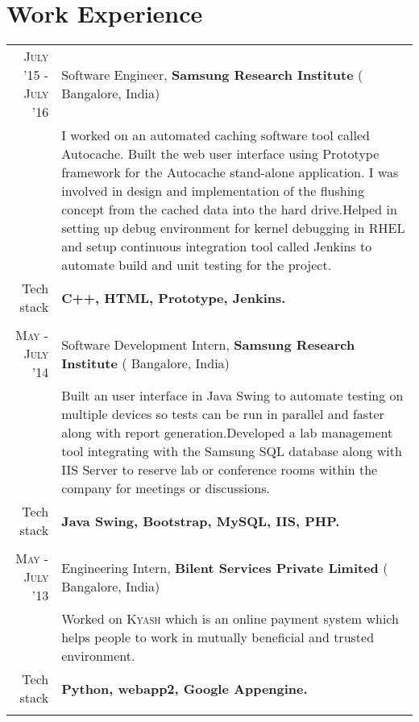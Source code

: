 \section{Work Experience}
\renewcommand{\arraystretch}{0.85}%
\begin{tabular}{r|p{14cm}}

\textsc{July '15 - July '16} & Software Engineer, \textbf{Samsung Research Institute} ( Bangalore, India) \\
& \small{I worked on an automated caching software tool called Autocache. Built the web user interface using Prototype framework for the Autocache stand-alone application. I was involved in design and implementation of the flushing concept from the cached data into the hard drive.Helped in setting up debug environment for kernel debugging in RHEL and setup continuous integration tool called Jenkins to automate build and unit testing for the project.}\\
\small{Tech stack} &\footnotesize{\textbf{C++, HTML, Prototype, Jenkins.}} \\
\multicolumn{2}{c}{} \\

\textsc{May - July '14} & Software Development Intern, \textbf{Samsung Research Institute} ( Bangalore, India) \\
& \small{Built an user interface in Java Swing to automate testing on multiple devices so tests can be run in parallel and faster along with report generation.Developed a lab management tool integrating with the Samsung SQL database along with IIS Server to reserve lab or conference rooms within the company for meetings or discussions.}\\
\small{Tech stack} &\footnotesize{\textbf{Java Swing, Bootstrap, MySQL, IIS, PHP.}} \\
\multicolumn{2}{c}{} \\

\textsc{May - July '13} & Engineering Intern, \textbf{Bilent Services Private Limited} ( Bangalore, India)\\
& \small{Worked on \textsc{Kyash} which is an online payment system which helps people to work in mutually beneficial and trusted environment.}\\
\small{Tech stack} &\footnotesize{\textbf{Python, webapp2, Google Appengine.}} \\
\multicolumn{2}{c}{} \\
\end{tabular}
